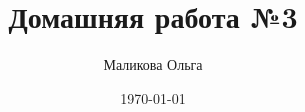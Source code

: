 \documentclass[12pt, a4paper]{article}
\author{Маликова Ольга}
\title{Домашняя работа №3}
\date{\today}
\begin{document}
\maketitle


\newenvironment{korob}
    {\renewcommand{\arraystretch}{1}
    \begin{center}
    \begin{tabular}{|p{0.5\textwidth}|}
    \hline \vspace{1pt} 
    }{ 
    \vspace{5pt} \\ \hline 
    \end{tabular} 
    \end{center}
    }
\newcommand{\billsay}[1]{
\begin{korob}
#1
\end{korob}

}
\end{document}
